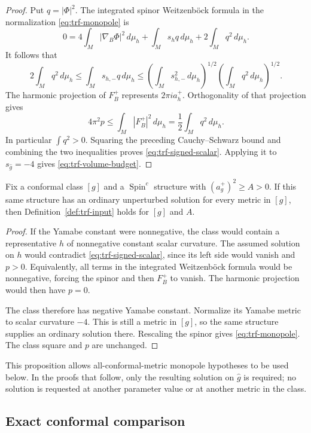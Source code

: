 \begin{proof}
Put $q=|\Phi|^2$.  The integrated spinor Weitzenb\"ock formula in
the normalization \eqref{eq:trf-monopole} is
\[
 0=4\int_M|\nabla_B\Phi|^2\,d\mu_h
       +\int_Ms_hq\,d\mu_h+2\int_Mq^2\,d\mu_h.
\]
It follows that
\[
 2\int_Mq^2\,d\mu_h
 \le\int_Ms_{h,-}q\,d\mu_h
 \le\left(\int_Ms_{h,-}^2\,d\mu_h\right)^{1/2}
      \left(\int_Mq^2\,d\mu_h\right)^{1/2}.
\]
The harmonic projection of $F_B^+$ represents $2\pi i a_h^+$.
Orthogonality of that projection gives
\[
 4\pi^2p\le\int_M|F_B^+|^2\,d\mu_h
             =\frac12\int_Mq^2\,d\mu_h.
\]
In particular $\int q^2>0$.  Squaring the preceding Cauchy--Schwarz
bound and combining the two inequalities proves
\eqref{eq:trf-signed-scalar}.  Applying it to $s_{\widehat g}=-4$
gives \eqref{eq:trf-volume-budget}.
\end{proof}

\begin{proposition}
\label{prop:trf-inheritance}
Fix a conformal class $[g]$ and a $\operatorname{Spin}^c$ structure
with $(a_g^+)^2\ge A>0$.  If this same structure has an ordinary
unperturbed solution for every metric in $[g]$, then
Definition~\ref{def:trf-input} holds for $[g]$ and $A$.
\end{proposition}

\begin{proof}
If the Yamabe constant were nonnegative, the class would contain a
representative $h$ of nonnegative constant scalar curvature.  The assumed
solution on $h$ would contradict \eqref{eq:trf-signed-scalar}, since its
left side would vanish and $p>0$.  Equivalently, all terms in the
integrated Weitzenb\"ock formula would be nonnegative, forcing the spinor
and then $F_B^+$ to vanish.  The harmonic projection would then have
$p=0$.

The class therefore has negative Yamabe constant.  Normalize its Yamabe
metric to scalar curvature $-4$.  This is still a metric in $[g]$, so the
same structure supplies an ordinary solution there.  Rescaling the
spinor gives \eqref{eq:trf-monopole}.  The class square and $p$ are
unchanged.
\end{proof}

This proposition allows all-conformal-metric monopole hypotheses to be
used below.  In the proofs that follow, only the resulting solution on
$\widehat g$ is required; no solution is requested at another parameter
value or at another metric in the class.

\subsection{Exact conformal comparison}

